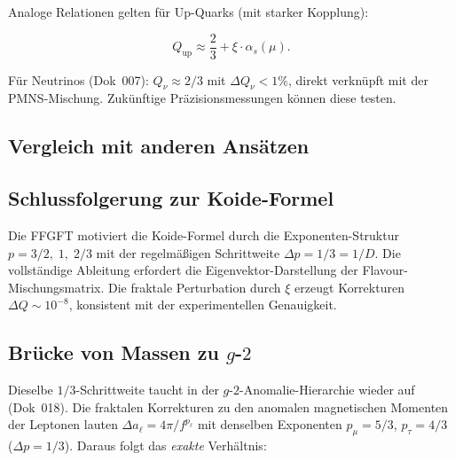 	Analoge Relationen gelten für Up-Quarks (mit starker Kopplung):
	
	\begin{equation}
		Q_{\text{up}} \approx \frac{2}{3} + \xi \cdot \alpha_s(\mu).
	\end{equation}
	
	Für Neutrinos (Dok~007): \(Q_\nu \approx 2/3\) mit \(\Delta Q_\nu < 1\%\), direkt verknüpft mit der PMNS-Mischung. Zukünftige Präzisionsmessungen können diese testen.
	
	\subsection*{Vergleich mit anderen Ansätzen}
	
	\begin{center}
		\small
	\end{center}
	
	\subsection*{Schlussfolgerung zur Koide-Formel}
	
	Die FFGFT motiviert die Koide-Formel durch die Exponenten-Struktur \(p = 3/2,\; 1,\; 2/3\) mit der regelmäßigen Schrittweite \(\Delta p = 1/3 = 1/D\). Die vollständige Ableitung erfordert die Eigenvektor-Darstellung der Flavour-Mischungsmatrix. Die fraktale Perturbation durch \(\xi\) erzeugt Korrekturen \(\Delta Q \sim 10^{-8}\), konsistent mit der experimentellen Genauigkeit.
	
	\subsection*{Brücke von Massen zu \(g\)-\(2\)}
	
	Dieselbe \(1/3\)-Schrittweite taucht in der \(g\)-\(2\)-Anomalie-Hierarchie wieder auf (Dok~018). Die fraktalen Korrekturen zu den anomalen magnetischen Momenten der Leptonen lauten \(\Delta a_\ell = 4\pi/f^{p_\ell}\) mit denselben Exponenten \(p_\mu = 5/3\), \(p_\tau = 4/3\) (\(\Delta p = 1/3\)). Daraus folgt das \textit{exakte} Verhältnis:
	
